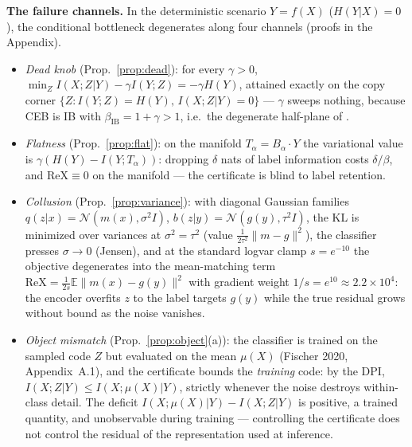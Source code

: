 \textbf{The failure channels.} In the deterministic scenario $Y = f(X)$ ($H(Y|X) = 0$),
the conditional bottleneck degenerates along four channels (proofs in the Appendix).
\begin{itemize}
\item \emph{Dead knob} (Prop.~\ref{prop:dead}): for every $\gamma > 0$,
$\min_Z I(X;Z|Y) - \gamma I(Y;Z) = -\gamma H(Y)$, attained exactly on the copy corner
$\{Z : I(Y;Z) = H(Y),\, I(X;Z|Y) = 0\}$ --- $\gamma$ sweeps nothing, because CEB is IB
with $\beta_{\mathrm{IB}} = 1 + \gamma > 1$, i.e.\ the degenerate half-plane of
\cite{kolchinsky2019caveats}.
\item \emph{Flatness} (Prop.~\ref{prop:flat}): on the manifold
$T_\alpha = B_\alpha \cdot Y$ the variational value is
$\gamma(H(Y) - I(Y;T_\alpha))$: dropping $\delta$ nats of label information costs
$\delta/\beta$, and $\mathrm{ReX} \equiv 0$ on the manifold --- the certificate is blind
to label retention.
\item \emph{Collusion} (Prop.~\ref{prop:variance}): with diagonal Gaussian families
$q(z|x) = \mathcal{N}(m(x), \sigma^2 I)$, $b(z|y) = \mathcal{N}(g(y), \tau^2 I)$, the KL
is minimized over variances at $\sigma^2 = \tau^2$ (value
$\tfrac{1}{2\tau^2}\|m-g\|^2$), the classifier presses $\sigma \to 0$ (Jensen), and at
the standard logvar clamp $s = e^{-10}$ the objective degenerates into the mean-matching
term $\mathrm{ReX} = \tfrac{1}{2s}\mathbb{E}\|m(x) - g(y)\|^2$ with gradient weight
$1/s = e^{10} \approx 2.2\times10^{4}$: the encoder overfits $z$ to the label targets
$g(y)$ while the true residual grows without bound as the noise vanishes.
\item \emph{Object mismatch} (Prop.~\ref{prop:object}(a)): the classifier is trained on
the sampled code $Z$ but evaluated on the mean $\mu(X)$ (Fischer 2020, Appendix~A.1), and
the certificate bounds the \emph{training} code: by the DPI,
$I(X;Z|Y) \le I(X;\mu(X)|Y)$, strictly whenever the noise destroys within-class detail.
The deficit $I(X;\mu(X)|Y) - I(X;Z|Y)$ is positive, a trained quantity, and unobservable
during training --- controlling the certificate does not control the residual of the
representation used at inference.
\end{itemize}


